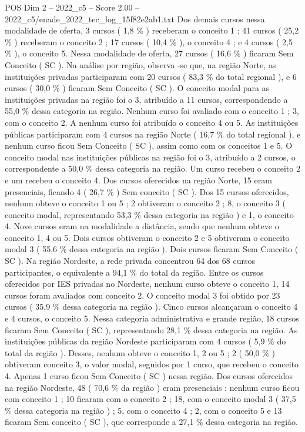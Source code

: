 \begin{textsample}{POS Dim 2 – 2022\_c5 – Score 2.00 – 2022\_c5/enade\_2022\_tec\_log\_15f82e2ab1.txt}
Dos demais cursos nessa modalidade de oferta, 3 cursos ( 1,8 \% ) receberam o conceito 1 ; 41 cursos ( 25,2 \% ) receberam o conceito 2 ; 17 cursos ( 10,4 \% ), o conceito 4 ; e 4 cursos ( 2,5 \% ), o conceito 5.
Nessa modalidade de oferta, 27 cursos ( 16,6 \% ) ficaram Sem Conceito ( SC ).
Na análise por região, observa -se que, na região Norte, as instituições privadas participaram com 20 cursos ( 83,3 \% do total regional ), e 6 cursos ( 30,0 \% ) ficaram Sem Conceito ( SC ).
O conceito modal para as instituições privadas na região foi o 3, atribuído a 11 cursos, correspondendo a 55,0 \% dessa categoria na região.
Nenhum curso foi avaliado com o conceito 1 ; 3, com o conceito 2.
A nenhum curso foi atribuído o conceito 4 ou 5.
As instituições públicas participaram com 4 cursos na região Norte ( 16,7 \% do total regional ), e nenhum curso ficou Sem Conceito ( SC ), assim como com os conceitos 1 e 5.
O conceito modal nas instituições públicas na região foi o 3, atribuído a 2 cursos, o correspondente a 50,0 \% dessa categoria na região.
Um curso recebeu o conceito 2 e um recebeu o conceito 4.
Dos cursos oferecidos na região Norte, 15 eram presenciais, ficando 4 ( 26,7 \% ) Sem conceito ( SC ).
Dos 15 cursos oferecidos, nenhum obteve o conceito 1 ou 5 ; 2 obtiveram o conceito 2 ; 8, o conceito 3 ( conceito modal, representando 53,3 \% dessa categoria na região ) e 1, o conceito 4.
Nove cursos eram na modalidade a distância, sendo que nenhum obteve o conceito 1, 4 ou 5.
Dois cursos obtiveram o conceito 2 e 5 obtiveram o conceito modal 3 ( 55,6 \% dessa categoria na região ).
Dois cursos ficaram Sem Conceito ( SC ).
Na região Nordeste, a rede privada concentrou 64 dos 68 cursos participantes, o equivalente a 94,1 \% do total da região.
Entre os cursos oferecidos por IES privadas no Nordeste, nenhum curso obteve o conceito 1, 14 cursos foram avaliados com conceito 2.
O conceito modal 3 foi obtido por 23 cursos ( 35,9 \% dessa categoria na região ).
Cinco cursos alcançaram o conceito 4 e 4 cursos, o conceito 5.
Nessa categoria administrativa e grande região, 18 cursos ficaram Sem Conceito ( SC ), representando 28,1 \% dessa categoria na região.
As instituições públicas da região Nordeste participaram com 4 cursos ( 5,9 \% do total da região ).
Desses, nenhum obteve o conceito 1, 2 ou 5 ; 2 ( 50,0 \% ) obtiveram conceito 3, o valor modal, seguidos por 1 curso, que recebeu o conceito 4.
Apenas 1 curso ficou Sem Conceito ( SC ) nessa região.
Dos cursos oferecidos na região Nordeste, 48 ( 70,6 \% da região ) eram presenciais : nenhum curso ficou com conceito 1 ; 10 ficaram com o conceito 2 ; 18, com o conceito modal 3 ( 37,5 \% dessa categoria na região ) ; 5, com o conceito 4 ; 2, com o conceito 5 e 13 ficaram Sem conceito ( SC ), que corresponde a 27,1 \% dessa categoria na região.

\end{textsample}
